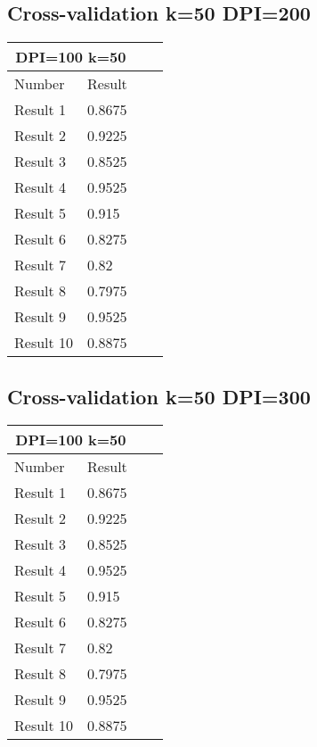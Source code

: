 \documentclass[paper=a4, fontsize=11pt]{scrartcl} %
\numberwithin{equation}{section} %
\numberwithin{figure}{section} %
\numberwithin{table}{section} %
\begin{document}
\subsection*{Cross-validation k=50 DPI=200}
\begin{center}
\begin{tabular}{ |p{3cm}|p{3cm}|p{3cm}|p{3cm}|  }
 \hline
 \multicolumn{2}{|c|}{DPI=100 k=50} \\
 \hline
 Number & Result\\
 \hline
 Result 1 & 0.8675 \\
 Result 2 & 0.9225 \\
 Result 3 & 0.8525 \\
 Result 4 & 0.9525\\ 
 Result 5 & 0.915 \\
 Result 6 & 0.8275 \\
 Result 7 & 0.82 \\
 Result 8 & 0.7975 \\
 Result 9 & 0.9525 \\
 Result 10 & 0.8875\\
 \hline
\end{tabular}
\end{center}

\subsection*{Cross-validation k=50 DPI=300}
\begin{center}
\begin{tabular}{ |p{3cm}|p{3cm}|p{3cm}|p{3cm}|  }
 \hline
 \multicolumn{2}{|c|}{DPI=100 k=50} \\
 \hline
 Number & Result\\
 \hline
 Result 1 & 0.8675 \\
 Result 2 & 0.9225 \\
 Result 3 & 0.8525 \\
 Result 4 & 0.9525\\ 
 Result 5 & 0.915 \\
 Result 6 & 0.8275 \\
 Result 7 & 0.82 \\
 Result 8 & 0.7975 \\
 Result 9 & 0.9525 \\
 Result 10 & 0.8875\\
 \hline
\end{tabular}
\end{center}
\end{document}
